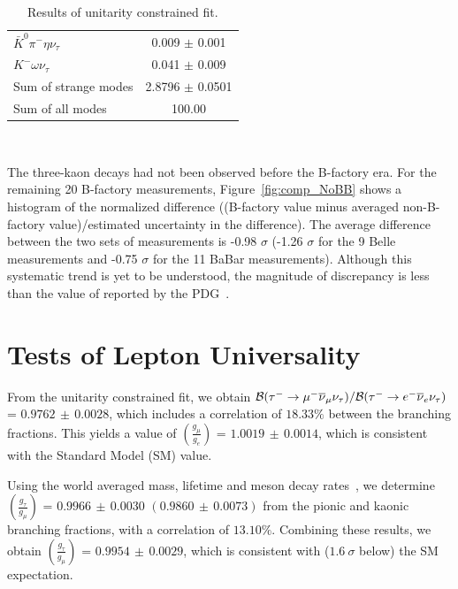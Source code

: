 \documentclass[fleqn,twoside]{article}
\begin{document}
\begin{table}[!hbtp]
\begin{tabular}{l| c}
$\bar{K}^0 \pi^- \eta \nu_\tau$                                     & 0.009 $\pm$ 0.001 \\ 
$K^- \omega \nu_\tau$                                              & 0.041 $\pm$ 0.009 \\ 
\hline
Sum of strange modes                                              & 2.8796 $\pm$ 0.0501 \\ \hline
Sum of all modes                                                  & 100.00              \\ \hline
\end{tabular}\\[2pt]
\caption{Results of unitarity constrained fit.}
\label{tab:TauGlobalFit}
\end{table}

The three-kaon decays had not been observed before the B-factory era.
For the remaining 20 B-factory measurements, 
Figure~\ref{fig:comp_NoBB} shows a histogram of the normalized difference 
((B-factory value minus averaged non-B-factory value)/estimated uncertainty in the difference).
The average difference between the two sets of measurements is -0.98 $\sigma$ 
(-1.26 $\sigma$ for the 9 Belle measurements and -0.75 $\sigma$ for the 11 BaBar measurements).
Although this systematic trend is yet to be understood,
the magnitude of discrepancy is less than the value of reported by the PDG~\cite{PDG_2010}.



\section{Tests of Lepton Universality}
\label{sec:Tau_LU}

From the unitarity constrained fit, we obtain
$
{{\cal{B}}({\tau^- \to \mu^- \overline{\nu}_\mu \nu_\tau})}/
{{\cal{B}}({\tau^- \to e^- \overline{\nu}_e  \nu_\tau})}$
= 
$0.9762\, \pm\,   0.0028$,
which includes a correlation of $18.33\%$
between the branching fractions.
This yields a value of $\left( \frac{g_\mu}{g_e} \right)$ = 
$1.0019\, \pm\, 0.0014$,
which is consistent with the Standard Model (SM) value.

Using the world averaged mass, lifetime and meson decay rates~\cite{PDG_2010}, we determine 
$\left( \frac{g_{\tau}}{g_{\mu}} \right)$ =
$0.9966\, \pm\, 0.0030$ $(0.9860\, \pm\, 0.0073)$
from the pionic and kaonic branching fractions,
with a correlation of $13.10\%$.
Combining these results, we obtain 
$\left( \frac{g_{\tau}}{g_{\mu}} \right)$ = $0.9954\, \pm\, 0.0029$,
which is consistent with ($1.6~\sigma$ below) the SM expectation.
\end{document}
